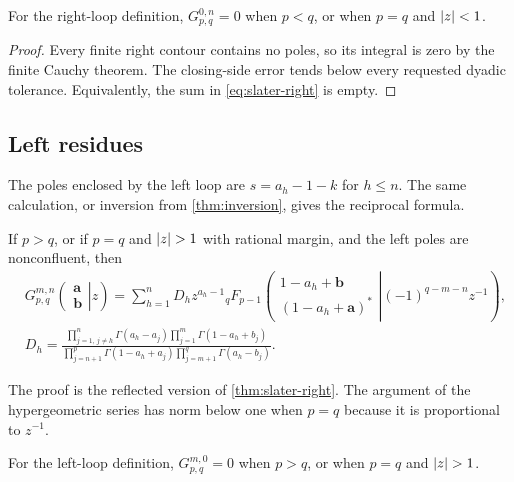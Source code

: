 \begin{corollary}\label{cor:mzero}
For the right-loop definition,
$G_{p,q}^{0,n}=0$ when $p<q$, or when $p=q$ and $\left|z\right|<1$.
\end{corollary}
\begin{proof}
Every finite right contour contains no poles, so its integral is zero by the
finite Cauchy theorem.  The closing-side error tends below every requested
dyadic tolerance.  Equivalently, the sum in \eqref{eq:slater-right} is empty.
\end{proof}

\subsection{Left residues}

The poles enclosed by the left loop are $s=a_h-1-k$ for $h\le n$.  The same
calculation, or inversion from \cref{thm:inversion}, gives the reciprocal
formula.

\begin{theorem}\label{thm:slater-left}
If $p>q$, or if $p=q$ and $\abs z>1$ with rational margin, and the left poles
are nonconfluent, then
\begin{align}
&G_{p,q}^{m,n}\!\left(\left.\begin{matrix}\mathbf a\\\mathbf b\end{matrix}\right|z\right)
 =\sum_{h=1}^{n}D_h z^{a_h-1}
 {}_qF_{p-1}\!\left(
 \left.\begin{matrix}1-a_h+\mathbf b\\
 (1-a_h+\mathbf a)^{\!*}
 \end{matrix}\right|(-1)^{q-m-n}z^{-1}\right),\label{eq:slater-left}\\
&D_h=
 \frac{\prod_{j=1,\,j\ne h}^{n}\Gamma(a_h-a_j)
       \prod_{j=1}^{m}\Gamma(1-a_h+b_j)}
      {\prod_{j=n+1}^{p}\Gamma(1-a_h+a_j)
       \prod_{j=m+1}^{q}\Gamma(a_h-b_j)}.
\end{align}
\end{theorem}
The proof is the reflected version of \cref{thm:slater-right}.  The argument of
the hypergeometric series has norm below one when $p=q$ because it is
proportional to $z^{-1}$.

\begin{corollary}\label{cor:nzero}
For the left-loop definition, $G_{p,q}^{m,0}=0$ when $p>q$, or when $p=q$ and
$\abs z>1$.
\end{corollary}

